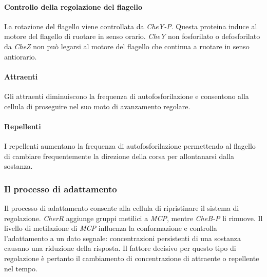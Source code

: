 			\paragraph{Controllo della regolazione del flagello}
			La rotazione del flagello viene controllata da \emph{CheY-P}.
			Questa proteina induce al motore del flagello di ruotare in senso orario.
			\emph{CheY} non fosforilato o defosforilato da \emph{CheZ} non pu\`o legarsi al motore del flagello che continua a ruotare in senso antiorario.

			\paragraph{Attraenti}
			Gli attraenti diminuiscono la frequenza di autofosforilazione e consentono alla cellula di proseguire nel suo moto di avanzamento regolare.

			\paragraph{Repellenti}
			I repellenti aumentano la frequenza di autofosforilazione permettendo al flagello di cambiare frequentemente la direzione della corsa per allontanarsi dalla sostanza.

		\subsubsection{Il processo di adattamento}
		Il processo di adattamento consente alla cellula di ripristinare il sistema di regolazione.
		\emph{CherR} aggiunge gruppi metilici a \emph{MCP}, mentre \emph{CheB-P} li rimuove.
		Il livello di metilazione di \emph{MCP} influenza la conformazione e controlla l'adattamento a un dato segnale: concentrazioni persistenti di una sostanza causano una riduzione della risposta.
		Il fattore decisivo per questo tipo di regolazione \`e pertanto il cambiamento di concentrazione di attraente o repellente nel tempo.
